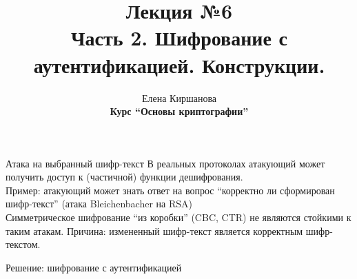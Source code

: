 \documentclass[usenames,dvipsnames,8pt,aspectratio=169]{beamer}
\title{Лекция №6 \\[10pt]
	Часть 2. Шифрование с аутентификацией.  Конструкции. }
\date{ Елена Киршанова \\  \textbf{Курс ``Основы криптографии''} \\  }
\begin{document}
	
\begin{frame}
	\titlepage
\end{frame}

\begin{frame}{Атака на выбранный шифр-текст}
	\Large 
	 В реальных протоколах атакующий может получить доступ к (частичной) функции {\color{Orange}  дешифрования}.  \\[10pt]
	 
	 Пример: атакующий может знать ответ на вопрос ``корректно ли сформирован шифр-текст'' (атака Bleichenbacher на RSA) \\[10pt]
	 
	 Симметрическое шифрование ``из коробки'' (CBC, CTR)  {\color{Orange}  не являются}  стойкими к таким атакам.  {\color{Orange} Причина:} измененный шифр-текст является  {\color{Orange}  корректным } шифр-текстом. \\[10pt]
	 
	 \centering
	 
	 {\color{Orange} Решение: } шифрование с аутентификацией
	 
	 
\end{frame}
\end{document}

